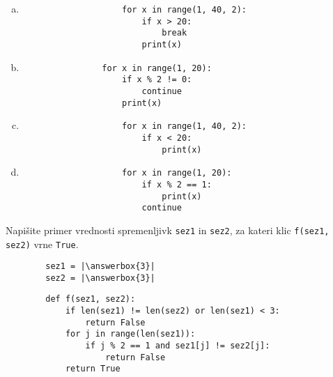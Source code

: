 \documentclass[arhiv, 10pt]{../izpit}
\newcommand{\inlinepy}[1]{\texttt{#1}}
\newcommand{\answerbox}[1]{\framebox{\vphantom{\large M}\hspace{#1cm}}}
\begin{document}
        \begin{multicols}{2}
        \begin{enumerate}[(a)]
\item 
                \begin{verbatim}
                    for x in range(1, 40, 2):
                        if x > 20:
                            break
                        print(x)
                \end{verbatim}
            
\item 
            \begin{verbatim}
                for x in range(1, 20):
                    if x % 2 != 0:
                        continue
                    print(x)
            \end{verbatim}
        
\item 
                \begin{verbatim}
                    for x in range(1, 40, 2):
                        if x < 20:
                            print(x)
                \end{verbatim}
            
\item 
                \begin{verbatim}
                    for x in range(1, 20):
                        if x % 2 == 1:
                            print(x)
                        continue
                \end{verbatim}
            
\end{enumerate}

        \end{multicols}
    
        \naloga*
        \begin{multicols}{2}
        \noindent
        Napišite primer vrednosti spremenljivk \inlinepy{sez1} in \inlinepy{sez2}, za kateri klic \inlinepy{f(sez1, sez2)} vrne \inlinepy{True}.
        \begin{verbatim}
        sez1 = |\answerbox{3}|
        sez2 = |\answerbox{3}|
        \end{verbatim}
        \vfil
        \columnbreak
        \begin{verbatim}
        def f(sez1, sez2):
            if len(sez1) != len(sez2) or len(sez1) < 3:
                return False
            for j in range(len(sez1)):
                if j % 2 == 1 and sez1[j] != sez2[j]:
                    return False
            return True
        \end{verbatim}
        \end{multicols}
    
\end{document}

